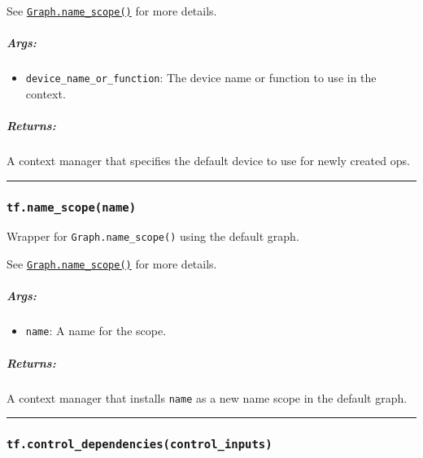 See
\href{../../api_docs/python/framework.md\#Graph.name_scope}{\lstinline{Graph.name_scope()}}
for more details.

\subparagraph{Args: }\label{args-21}

\begin{itemize}
\tightlist
\item
  \lstinline{device_name_or_function}: The device name or function to
  use in the context.
\end{itemize}

\subparagraph{Returns: }\label{returns-24}

A context manager that specifies the default device to use for newly
created ops.

\begin{center}\rule{0.5\linewidth}{\linethickness}\end{center}

\subsubsection{\texorpdfstring{\lstinline{tf.name_scope(name)}
}{tf.name_scope(name) }}\label{tf.nameux5fscopename}

Wrapper for \lstinline{Graph.name_scope()} using the default graph.

See
\href{../../api_docs/python/framework.md\#Graph.name_scope}{\lstinline{Graph.name_scope()}}
for more details.

\subparagraph{Args: }\label{args-22}

\begin{itemize}
\tightlist
\item
  \lstinline{name}: A name for the scope.
\end{itemize}

\subparagraph{Returns: }\label{returns-25}

A context manager that installs \lstinline{name} as a new name scope in the
default graph.

\begin{center}\rule{0.5\linewidth}{\linethickness}\end{center}

\subsubsection{\texorpdfstring{\lstinline{tf.control_dependencies(control_inputs)}
}{tf.control_dependencies(control_inputs) }}\label{tf.controlux5fdependenciescontrolux5finputs}


